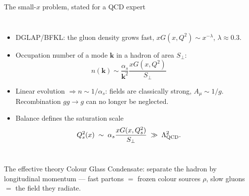 \documentclass[9pt,aspectratio=169]{beamer}
\newcommand{\hl}[1]{\textcolor{acc}{#1}}
\newcommand{\Qs}{Q_{s}}
\begin{document}
\begin{frame}{The small-$x$ problem, stated for a QCD expert}
\begin{columns}[T,onlytextwidth]
\begin{itemize}
  \item DGLAP/BFKL: the gluon density grows fast, $xG(x,Q^{2})\sim x^{-\lambda}$, $\lambda\approx0.3$.
  \item Occupation number of a mode $\bm k$ in a hadron of area $S_\perp$:
  \[
     n(\bm k)\sim \frac{\alpha_{s}}{\bm k^{2}}\frac{xG(x,Q^2)}{S_{\perp}}
  \]
  \item Linear evolution $\Rightarrow n\sim 1/\alpha_{s}$: \hl{fields are classically strong},
        $A_\mu\sim1/g$. Recombination $gg\to g$ can no longer be neglected.
  \item Balance defines the \hl{saturation scale}
  \[
      \Qs^{2}(x)\;\sim\;\alpha_{s}\frac{xG(x,\Qs^{2})}{S_{\perp}}\;\gg\;\Lambda^{2}_{\rm QCD}.
  \]
\end{itemize}
\begin{center}
\end{center}
\end{columns}
\medskip
\begin{alertblock}{The effective theory}
Colour Glass Condensate: separate the hadron by longitudinal momentum ---
\hl{fast partons} $=$ frozen colour sources $\rho$, \hl{slow gluons} $=$ the field they radiate.
\end{alertblock}
\end{frame}
\end{document}
